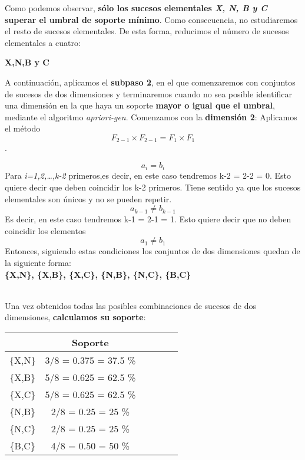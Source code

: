 \documentclass [a4paper] {article}
\begin{document}
Como podemos observar, \textbf{sólo los sucesos elementales \textit{X, N, B y C} superar el umbral de soporte mínimo}. Como consecuencia, no estudiaremos el resto de
sucesos elementales. De esta forma, reducimos el número de sucesos elementales a cuatro:

\hfil \textbf{X,N,B y C} \par

A continuación, aplicamos el \textbf{subpaso 2}, en el que comenzaremos con conjuntos de sucesos de dos dimensiones y terminaremos cuando no sea posible identificar una dimensión
en la que haya un soporte \textbf{mayor o igual que el umbral}, mediante el algoritmo \textit{apriori-gen}. Comenzamos con la \textbf{dimensión 2}:
Aplicamos el método \begin{equation*} F_{2-1} \times F_{2-1} = F_{1} \times F_{1} \end{equation*}.

\begin{equation*} a_{i}=b_{i} \end{equation*}  
Para \textit{i=1,2,…,k-2} primeros,es decir, en este caso tendremos k-2 = 2-2 = 0. Esto quiere decir que deben coincidir los k-2 primeros. 
Tiene sentido ya que los sucesos elementales son únicos y no se pueden repetir.
\begin{equation*} a_{k-1} \neq b_{k-1} \end{equation*} 
Es decir, en este caso tendremos k-1 = 2-1 = 1. Esto quiere decir que no deben coincidir los elementos 
\begin{equation*} a_{1} \neq b_{1} \end{equation*} 
Entonces, siguiendo estas condiciones los conjuntos de dos dimensiones quedan de la siguiente forma:
\\[1\baselineskip]

\hfil \textbf{\{X,N\}, \{X,B\}, \{X,C\}, \{N,B\}, \{N,C\}, \{B,C\}} \par \leavevmode
\\[1\baselineskip]
Una vez obtenidos todas las posibles combinaciones de sucesos de dos dimensiones, \textbf{calculamos su soporte}:

\begin{center}
\begin{tabular}{|c|c|c|c|c|c|}
\hline
        & Soporte\\ \hline
\{X,N\} & 3/8 = 0.375 = 37.5 \%		\\ \hline
\{X,B\} & 5/8 = 0.625 = 62.5 \%     \\ \hline
\{X,C\} & 5/8 = 0.625 = 62.5 \%     \\ \hline
\{N,B\} & 2/8 = 0.25  =  25 \%      \\ \hline
\{N,C\} & 2/8 = 0.25 = 25 \%     	\\ \hline
\{B,C\} & 4/8 = 0.50 = 50 \%     	\\ \hline
\end{tabular}
\end{center}
\end{document}
